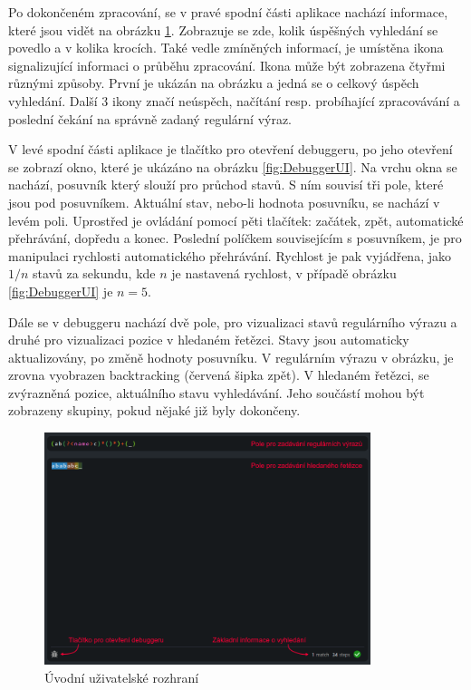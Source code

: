 Po dokončeném zpracování, se v pravé spodní části aplikace nachází informace, které jsou vidět na obrázku \ref{fig:GeneralUI}.
Zobrazuje se zde, kolik úspěšných vyhledání se povedlo a v kolika krocích.
Také vedle zmíněných informací, je umístěna ikona signalizující informaci o průběhu zpracování.
Ikona může být zobrazena čtyřmi různými způsoby.
První je ukázán na obrázku a jedná se o celkový úspěch vyhledání.
Další 3 ikony značí neúspěch, načítání resp. probíhající zpracovávání a poslední čekání na správně zadaný regulární výraz.

V levé spodní části aplikace je tlačítko pro otevření debuggeru, po jeho otevření se zobrazí okno, které je ukázáno na obrázku \ref{fig:DebuggerUI}.
Na vrchu okna se nachází, posuvník který slouží pro průchod stavů.
S ním souvisí tři pole, které jsou pod posuvníkem.
Aktuální stav, nebo-li hodnota posuvníku, se nachází v levém poli.
Uprostřed je ovládání pomocí pěti tlačítek: začátek, zpět, automatické přehrávání, dopředu a konec.
Poslední políčkem souvisejícím s posuvníkem, je pro manipulaci rychlosti automatického přehrávání.
Rychlost je pak vyjádřena, jako $1/n$ stavů za sekundu, kde $n$ je nastavená rychlost, v případě obrázku \ref{fig:DebuggerUI} je $n = 5$.

Dále se v debuggeru nachází dvě pole, pro vizualizaci stavů regulárního výrazu a druhé pro vizualizaci pozice v hledaném řetězci.
Stavy jsou automaticky aktualizovány, po změně hodnoty posuvníku.
V regulárním výrazu v obrázku, je zrovna vyobrazen backtracking (červená šipka zpět).
V hledaném řetězci, se zvýrazněná pozice, aktuálního stavu vyhledávání.
Jeho součástí mohou být zobrazeny skupiny, pokud nějaké již byly dokončeny.

\begin{figure}[!h]
	\centering
	\includegraphics[width=0.85\textwidth]{Figures/appWindow.png}
	\caption{Úvodní uživatelské rozhraní}
	\label{fig:GeneralUI}
\end{figure}

